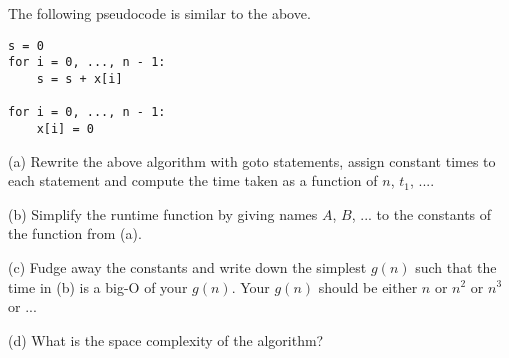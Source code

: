 The following pseudocode is similar to the above.
\begin{Verbatim}[frame=single, fontsize=\small]
s = 0
for i = 0, ..., n - 1:
    s = s + x[i]

for i = 0, ..., n - 1:
    x[i] = 0
\end{Verbatim}
(a) Rewrite the above algorithm with
goto statements, assign constant times to each statement and 
compute the time taken as a function of $n$, $t_1$, ....

(b) Simplify the runtime function by giving names $A$, $B$, ...
to the constants of the function from (a).

(c) Fudge away the constants and write down the simplest $g(n)$ such 
that the time in (b) is a big-O of your $g(n)$.
Your $g(n)$ should be either $n$ or $n^2$ or $n^3$ or ...

(d) What is the space complexity of the algorithm?
